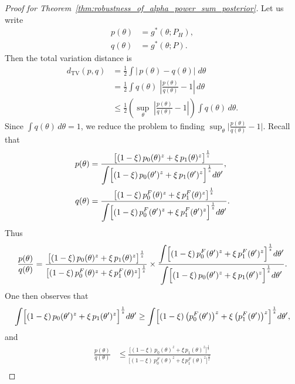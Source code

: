 \documentclass[12pt]{article}
\begin{document}
\begin{proof}[Proof for Theorem~\ref{thm:robustness_of_alpha_power_sum_posterior}]
    Let us write
    \begin{align*}
        p(\theta) &= g^*(\theta;P_H), \\
        q(\theta) &=  g^*(\theta;P).
    \end{align*}
    Then the total variation distance is
    \begin{align*}
        d_{\mathrm{TV}}(p,q) &= \frac{1}{2}\int\bigl|\,p(\theta)-q(\theta)\bigr|\;d\theta \\
        &= \frac{1}{2}\int q(\theta)\;\left|\frac{p(\theta)}{q(\theta)} - 1\right|\,d\theta \\
        &\leq \frac{1}{2}\left(\sup_{\theta}\;\left|\frac{p(\theta)}{q(\theta)}-1\right|\right)\int q(\theta)\,d\theta.
    \end{align*}
    Since $\int q(\theta)\,d\theta=1$, we reduce the problem to finding $\sup_{\theta}\bigl|\frac{p(\theta)}{q(\theta)}-1\bigr|$.  
    Recall that
    \begin{align*}
        p(\theta) &= \frac{\bigl[(1-\xi)\,p_0(\theta)^z + \xi\,p_1(\theta)^z\bigr]^{\frac1z}}{\displaystyle\int\Bigl[(1-\xi)\,p_0(\theta')^z + \xi\,p_1(\theta')^z\Bigr]^{\frac1z}d\theta'}, \\
        q(\theta) &= \frac{\bigl[(1-\xi)\,p_0^F(\theta)^z + \xi\,p_1^F(\theta)^z\bigr]^{\frac1z}}{\displaystyle\int\Bigl[(1-\xi)\,p_0^F(\theta')^z + \xi\,p_1^F(\theta')^z \Bigr]^{\frac1z} d\theta'}.
    \end{align*}
    Thus
    \begin{align*}
        \frac{p(\theta)}{q(\theta)} = \frac{\bigl[(1-\xi)\,p_0(\theta)^z + \xi\,p_1(\theta)^z\bigr]^{\frac1z}}{\bigl[(1-\xi)\,p_0^F(\theta)^z + \xi\,p_1^F(\theta)^z\bigr]^{\frac1z}} \times \frac{\displaystyle\int\Bigl[(1-\xi)\,p_0^F(\theta')^z + \xi\,p_1^F(\theta')^z \Bigr]^{\frac1z}d\theta'}{\displaystyle \int \Bigl[(1-\xi)\,p_0(\theta')^z + \xi\,p_1(\theta')^z \Bigr]^{\frac1z} d\theta'}.
    \end{align*}
    One then observes that
    \begin{align*}
        \int\Bigl[(1-\xi)\,p_0(\theta')^z + \xi\,p_1(\theta')^z\Bigr]^{\frac1z}d\theta' \geq \int \Bigl[(1-\xi)\,\bigl(p_0^F(\theta')\bigr)^z + \xi\,\bigl(p_1^F(\theta')\bigr)^z\Bigr]^{\frac1z} d\theta',
    \end{align*}
    and
    \begin{align*}
        \frac{p(\theta)}{q(\theta)} &\leq \frac{\bigl[(1-\xi)\,p_0(\theta)^z + \xi\,p_1(\theta)^z\bigr]^{\frac1z}}{ \bigl[(1-\xi)\,p_0^F(\theta)^z + \xi\,p_1^F(\theta)^z\bigr]^{\frac1z}} \\

\end{align*}
\end{proof}
\end{document}
